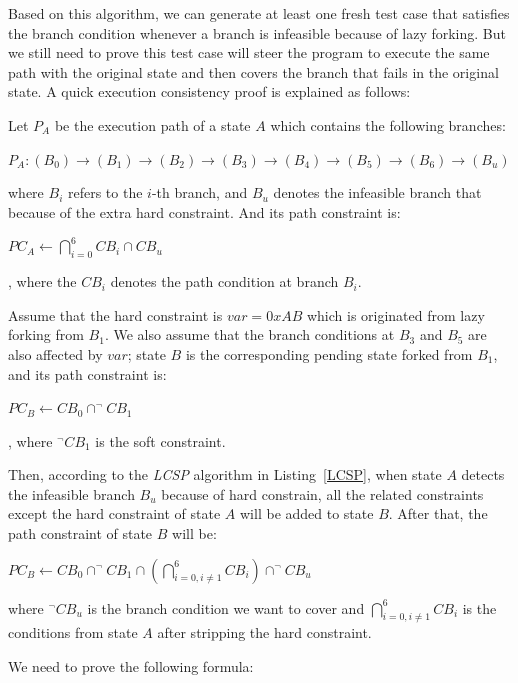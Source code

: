 Based on this algorithm, we can generate at least one fresh test case 
that satisfies the branch condition whenever a branch is infeasible 
because of lazy forking. But we still need to prove this test case 
will steer the program to execute the same path with the original 
state and then covers the branch that fails in the original state. 
A quick execution consistency proof is explained as follows:

Let $P_A$ be the execution path of a state $A$ which contains 
the following branches:
\begin{center}
$P_A:(B_0) \rightarrow (B_1) \rightarrow (B_2) \rightarrow 
(B_3) \rightarrow (B_4) \rightarrow (B_5) \rightarrow (B_6) \rightarrow (B_u)$
\end{center}

\noindent where $B_i$ refers to the $i$-th branch, and $B_u$ 
denotes the infeasible branch that because of the extra hard constraint.
And its path constraint is:
\begin{center}
$PC_A\leftarrow \displaystyle \bigcap\limits_{i=0}^{6} CB_i \cap CB_u$
\end{center}
, where the $CB_i$ denotes the path condition at branch $B_i$.

Assume that the hard constraint is $var=0xAB$ which is originated 
from lazy forking from $B_1$. 
We also assume that the branch conditions at $B_3$ and $B_5$ are 
also affected by $var$; state $B$ is the corresponding pending state 
forked from $B_1$, and its path constraint is:
\begin{center}
$PC_B\leftarrow\displaystyle CB_0 \cap ^\neg CB_1$
\end{center}
, where $^\neg CB_1$ is the soft constraint.

Then, according to the \textit{LCSP} algorithm in Listing~\ref{LCSP}, 
when state $A$ detects the infeasible branch $B_u$ because of hard 
constrain, all the related constraints except the hard constraint 
of state $A$ will be added to state $B$. After that, the path 
constraint of state $B$ will be:

\begin{center}
$PC_B\leftarrow\displaystyle CB_0 \cap ^\neg CB_1 
\cap (\bigcap\limits_{i=0,i \neq 1}^{6} CB_i) \cap ^\neg CB_u$
\end{center}
where $^\neg CB_u $ is the branch condition we want to cover 
and $\bigcap_{i=0,i \neq 1}^{6} CB_i$ is the conditions from 
state $A$ after stripping the hard constraint.

We need to prove the following formula:


